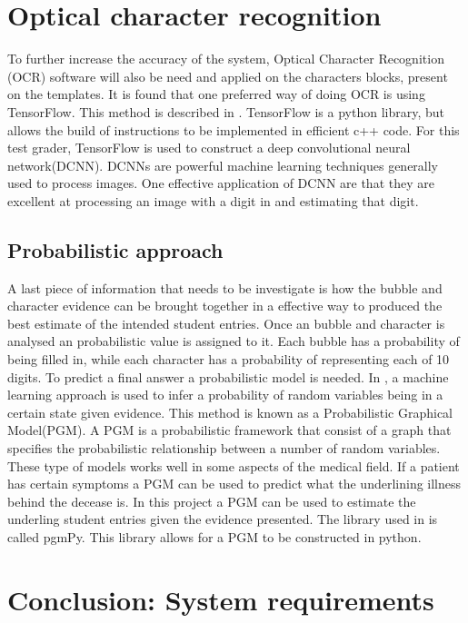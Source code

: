 \section{Optical character recognition}

To further increase the accuracy of the system, Optical Character Recognition (OCR) software will also be need and applied on the characters blocks, present on the templates. It is found that one preferred way of doing OCR is using TensorFlow. This method is described in \citet{Tensor}. TensorFlow is a python library, but allows the build of instructions to be implemented in ef{f}icient c++ code. For this test grader, TensorFlow is used to construct a deep convolutional neural network(DCNN). DCNNs are powerful machine learning techniques generally used to process images. One effective application of DCNN are that they are excellent at processing an image with a digit in and estimating that digit.

\subsection{Probabilistic approach}

A last piece of information that needs to be investigate is how the bubble and character evidence can be brought together in a effective way to produced the best estimate of the intended student entries. Once an bubble and character is analysed an probabilistic value is assigned to it. Each bubble has a probability of being filled in, while each character has a probability of representing each of 10 digits. To predict a final answer a probabilistic model is needed. In \citet{pgmPy}, a machine learning approach is used to infer a probability of random variables being in a certain state given evidence. This method is known as a Probabilistic Graphical Model(PGM). A PGM is a probabilistic framework that consist of a graph that specifies the probabilistic relationship between a number of random variables. These type of models works well in some aspects of the medical field. If a patient has certain symptoms a PGM can be used to predict what the underlining illness behind the decease is. In this project a PGM can be used to estimate the underling student entries given the evidence presented. The library used in \citet{pgmPy} is called pgmPy. This library allows for a PGM to be constructed in python. 

\section{Conclusion: System requirements}

